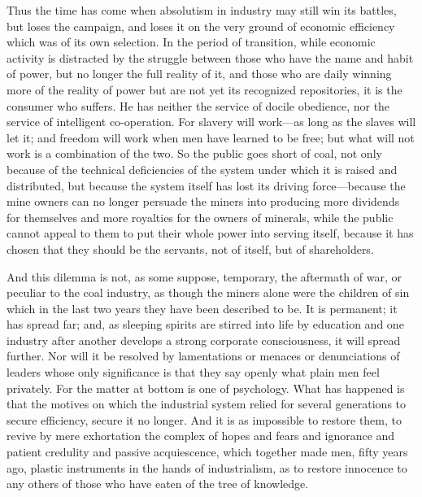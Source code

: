 \documentclass{book}
\begin{document}
Thus the time has come when absolutism in industry may still win its battles, but loses the campaign, and loses it on the very ground of economic efficiency which was of its own selection. In the period of transition, while economic activity is distracted by the struggle between those who have the name and habit of power, but no longer the full reality of it, and those who are daily winning more of the reality of power but are not yet its recognized repositories, it is the consumer who suffers. He has neither the service of docile obedience, nor the service of intelligent co-operation. For slavery will work—as long as the slaves will let it; and freedom will work when men have learned to be free; but what will not work is a combination of the two. So the public goes short of coal, not only because of the technical deficiencies of the system under which it is raised and distributed, but because the system itself has lost its driving force—because the mine owners can no longer persuade the miners into producing more dividends for themselves and more royalties for the owners of minerals, while the public cannot appeal to them to put their whole power into serving itself, because it has chosen that they should be the servants, not of itself, but of shareholders.

And this dilemma is not, as some suppose, temporary, the aftermath of war, or peculiar to the coal industry, as though the miners alone were the children of sin which in the last two years they have been described to be. It is permanent; it has spread far; and, as sleeping spirits are stirred into life by education and one industry after another develops a strong corporate consciousness, it will spread further. Nor will it be resolved by lamentations or menaces or denunciations of leaders whose only significance is that they say openly what plain men feel privately. For the matter at bottom is one of psychology. What has happened is that the motives on which the industrial system relied for several generations to secure efficiency, secure it no longer. And it is as impossible to restore them, to revive by mere exhortation the complex of hopes and fears and ignorance and patient credulity and passive acquiescence, which together made men, fifty years ago, plastic instruments in the hands of industrialism, as to restore innocence to any others of those who have eaten of the tree of knowledge.
\end{document}

